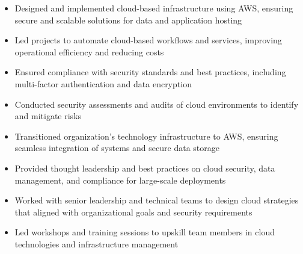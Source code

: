 \par\smallskip
\noindent
\begin{minipage}{20cm}
  \begin{minipage}{9.75cm}
    \begin{itemize}
      \item Designed and implemented cloud-based infrastructure using AWS, ensuring secure and scalable solutions for data and application hosting
      \item Led projects to automate cloud-based workflows and services, improving operational efficiency and reducing costs
    \end{itemize}
  \end{minipage}
  \hfill
  \begin{minipage}{9.75cm}
    \begin{itemize}
      \item Ensured compliance with security standards and best practices, including multi-factor authentication and data encryption
      \item Conducted security assessments and audits of cloud environments to identify and mitigate risks
    \end{itemize}
  \end{minipage}
\end{minipage}
\par\smallskip
\divider

\par\smallskip
\noindent
\begin{minipage}{20cm}
  \begin{minipage}{9.75cm}
    \begin{itemize}
      \item Transitioned organization’s technology infrastructure to AWS, ensuring seamless integration of systems and secure data storage
      \item Provided thought leadership and best practices on cloud security, data management, and compliance for large-scale deployments
    \end{itemize}
  \end{minipage}
  \hfill
  \begin{minipage}{9.75cm}
    \begin{itemize}
      \item Worked with senior leadership and technical teams to design cloud strategies that aligned with organizational goals and security requirements
      \item Led workshops and training sessions to upskill team members in cloud technologies and infrastructure management
    \end{itemize}
  \end{minipage}
\end{minipage}

